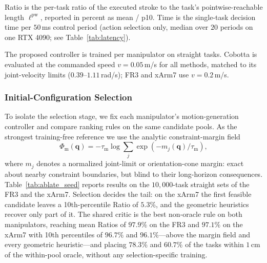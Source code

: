 \documentclass[journal, twoside]{IEEEtran}
\begin{document}
\begin{table}[!htbp]
\begin{threeparttable}
\begin{tablenotes}
    Ratio is the per-task ratio of the executed stroke to the task's
    pointwise-reachable length $\ell^{\mathrm{pw}}$, reported in percent
    as mean / p10. Time is the single-task decision time per
    $50$\,ms control period (action selection only, median over $20$
    periods on one RTX 4090; see Table~\ref{tab:latency}).
    \item[Note 2] The proposed controller is trained per manipulator on
    straight tasks. Cobotta is evaluated at the commanded speed
    $v=0.05$\,m/s for all methods, matched to its joint-velocity limits
    ($0.39$--$1.11$\,rad/s); FR3 and xArm7 use $v=0.2$\,m/s.
\end{tablenotes}
\end{threeparttable}
\end{table}






\subsubsection{Initial-Configuration Selection}
\label{sec:branch}
\label{sec:ablate_seed}

To isolate the selection stage, we fix each manipulator's
motion-generation controller and compare ranking rules on the same
candidate pools. As the strongest training-free reference we use the
analytic constraint-margin field
\begin{equation}
\label{eq:margin-field}
\Phi_{\mathrm{m}}(\mathbf{q})
=
-\tau_{\mathrm{m}}
\log
\sum_{j}
\exp\left(
-m_{j}(\mathbf{q})/\tau_{\mathrm{m}}
\right),
\end{equation}
where $m_j$ denotes a normalized joint-limit or orientation-cone margin:
exact about nearby constraint boundaries, but blind to their long-horizon
consequences. Table~\ref{tab:ablate_seed} reports results on the
$10{,}000$-task straight sets of the FR3 and the xArm7. Selection
decides the tail: on the xArm7 the first feasible candidate leaves a
10th-percentile Ratio of $5.3\%$, and the geometric heuristics recover
only part of it. The shared critic is the best non-oracle rule on both
manipulators, reaching mean Ratios of $97.9\%$ on the FR3 and $97.1\%$
on the xArm7 with 10th percentiles of $96.7\%$ and $96.1\%$---above the
margin field and every geometric heuristic---and placing $78.3\%$ and
$60.7\%$ of the tasks within $1$\,cm of the within-pool oracle, without
any selection-specific training.
\end{document}

